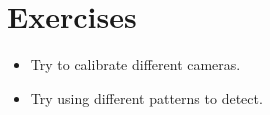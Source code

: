 \documentclass[]{article}
\providecommand{\tightlist}{%
  \setlength{\itemsep}{0pt}\setlength{\parskip}{0pt}}
\begin{document}
\section{Exercises}\label{exercises}

\begin{itemize}
\tightlist
\item
  Try to calibrate different cameras.
\item
  Try using different patterns to detect.
\end{itemize}
\end{document}
